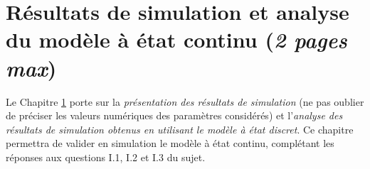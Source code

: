 \chapter{Résultats de simulation et analyse du modèle à état continu (\textit{2 pages max})}
\label{ch:simu}


Le Chapitre \ref{ch:simu} porte sur la \textit{présentation des résultats de simulation} (ne pas oublier de préciser les valeurs numériques des paramètres considérés) et l’\textit{analyse des résultats de simulation obtenus en utilisant le modèle à état discret}.
Ce chapitre permettra de valider en simulation le modèle à état continu, complétant les réponses aux questions I.1, I.2 et I.3 du sujet.
